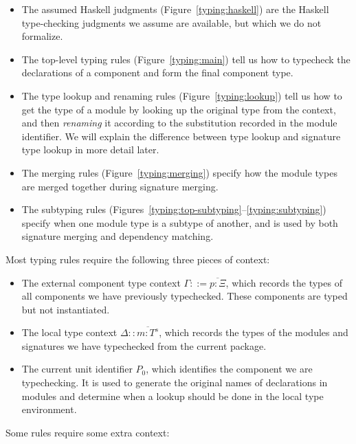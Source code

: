 \begin{itemize}
    \item The assumed Haskell judgments (Figure~\ref{typing:haskell}) are the
        Haskell type-checking judgments we assume are available, but which
        we do not formalize.

    \item The top-level typing rules (Figure~\ref{typing:main}) tell us
        how to typecheck the declarations of a component and form the final
        component type.

    \item The type lookup and renaming rules (Figure~\ref{typing:lookup}) tell us how to
        get the type of a module by looking up the original type from
        the context, and then \emph{renaming} it according to the substitution
        recorded in the module identifier.  We will explain the difference
        between type lookup and signature type lookup in more detail later.

    \item The merging rules (Figure~\ref{typing:merging}) specify how the
        module types are merged together during signature merging.

    \item The subtyping rules (Figures~\ref{typing:top-subtyping}--\ref{typing:subtyping})
        specify when one module type is a subtype of another, and is used
        by both signature merging and dependency matching.

\end{itemize}
Most typing rules require the following three pieces of context:

\begin{itemize}
    \item The external component type context $\Gamma ::= \overline{p : \Xi}$,
        which records the types of all components we have previously
        typechecked.  These components are typed but not instantiated.
    \item The local type context $\Delta :: \overline{m : T^s}$,
        which records the types of the modules and signatures we have typechecked
        from the current package.
    \item The current unit identifier $P_0$, which identifies the component
        we are typechecking. It is used to generate the original names
        of declarations in modules and determine when a lookup should be
        done in the local type environment.
\end{itemize}
Some rules require some extra context:

